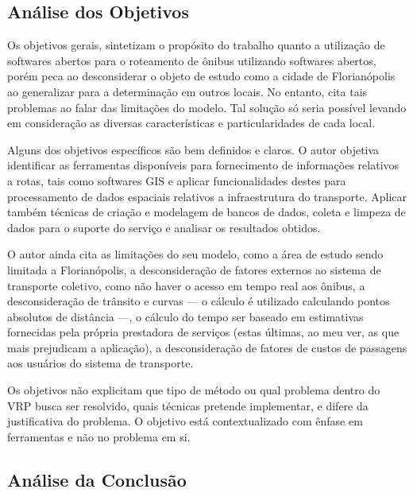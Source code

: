 \documentclass[
    article,
    12pt,
    a4paper,
    english,
    brazil,
    sumario=tradicional
]{/home/lucas_galdino/Desktop/TCC/planning/abntex2/abntex2}
\begin{document}
\subsection{Análise dos Objetivos}

Os objetivos gerais, sintetizam o propósito do trabalho quanto a utilização
de softwares abertos para o roteamento de ônibus utilizando softwares abertos,
porém peca ao desconsiderar o objeto de estudo como a cidade de Florianópolis ao generalizar para a
determinação em outros locais. No entanto, cita tais problemas ao falar das limitações do modelo.
Tal solução só seria possível levando em consideração as diversas características e particularidades de cada local.\par

Alguns dos objetivos específicos são bem definidos e claros. O autor objetiva identificar as ferramentas disponíveis para
fornecimento de informações relativos a rotas, tais como softwares GIS e aplicar funcionalidades destes para processamento
de dados espaciais relativos a infraestrutura do transporte. Aplicar também técnicas de criação e modelagem de bancos de dados,
coleta e limpeza de dados para o suporte do serviço e analisar os resultados obtidos.\par

O autor ainda cita as limitações do seu modelo, como a área de estudo sendo limitada a Florianópolis, a desconsideração de fatores
externos ao sistema de transporte coletivo, como não haver o acesso em tempo real aos ônibus, a desconsideração de trânsito e curvas
— o cálculo é utilizado calculando pontos absolutos de distância —, o cálculo do tempo ser baseado em estimativas fornecidas pela
própria prestadora de serviços (estas últimas, ao meu ver, as que mais prejudicam a aplicação), a desconsideração de fatores de custos
de passagens aos usuários do sistema de transporte.\par

Os objetivos não explicitam que tipo de método ou qual problema dentro do VRP busca ser resolvido, quais técnicas pretende implementar,
e difere da justificativa do problema. O objetivo está contextualizado com ênfase em ferramentas e não no problema em si.\par

\subsection{Análise da Conclusão}
\end{document}
